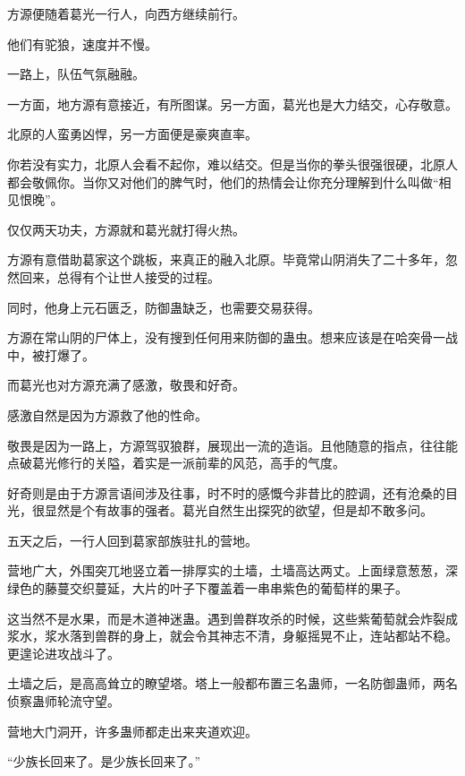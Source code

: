 
\begin{this_body}



方源便随着葛光一行人，向西方继续前行。

他们有驼狼，速度并不慢。

一路上，队伍气氛融融。

一方面，地方源有意接近，有所图谋。另一方面，葛光也是大力结交，心存敬意。

北原的人蛮勇凶悍，另一方面便是豪爽直率。

你若没有实力，北原人会看不起你，难以结交。但是当你的拳头很强很硬，北原人都会敬佩你。当你又对他们的脾气时，他们的热情会让你充分理解到什么叫做“相见恨晚”。

仅仅两天功夫，方源就和葛光就打得火热。

方源有意借助葛家这个跳板，来真正的融入北原。毕竟常山阴消失了二十多年，忽然回来，总得有个让世人接受的过程。

同时，他身上元石匮乏，防御蛊缺乏，也需要交易获得。

方源在常山阴的尸体上，没有搜到任何用来防御的蛊虫。想来应该是在哈突骨一战中，被打爆了。

而葛光也对方源充满了感激，敬畏和好奇。

感激自然是因为方源救了他的性命。

敬畏是因为一路上，方源驾驭狼群，展现出一流的造诣。且他随意的指点，往往能点破葛光修行的关隘，着实是一派前辈的风范，高手的气度。

好奇则是由于方源言语间涉及往事，时不时的感慨今非昔比的腔调，还有沧桑的目光，很显然是个有故事的强者。葛光自然生出探究的欲望，但是却不敢多问。

五天之后，一行人回到葛家部族驻扎的营地。

营地广大，外围突兀地竖立着一排厚实的土墙，土墙高达两丈。上面绿意葱葱，深绿色的藤蔓交织蔓延，大片的叶子下覆盖着一串串紫色的葡萄样的果子。

这当然不是水果，而是木道神迷蛊。遇到兽群攻杀的时候，这些紫葡萄就会炸裂成浆水，浆水落到兽群的身上，就会令其神志不清，身躯摇晃不止，连站都站不稳。更遑论进攻战斗了。

土墙之后，是高高耸立的瞭望塔。塔上一般都布置三名蛊师，一名防御蛊师，两名侦察蛊师轮流守望。

营地大门洞开，许多蛊师都走出来夹道欢迎。

“少族长回来了。是少族长回来了。”


\end{this_body}
